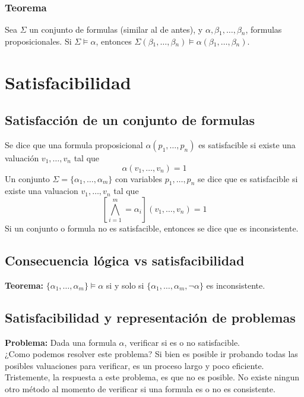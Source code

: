 \documentclass{article}
\begin{document}
\subsubsection{Teorema}
Sea $\Sigma$ un conjunto de formulas (similar al de antes), y $\alpha{}, \beta{}_{1}, \ldots{}, \beta{}_{n}$, formulas proposicionales. Si $\Sigma{} \models{} \alpha{}$, entonces $\Sigma{}(\beta{}_{1}, \ldots{}, \beta{}_{n}) \models{} \alpha{}(\beta{}_{1}, \ldots{}, \beta{}_{n})$.

\section{Satisfacibilidad}
\subsection{Satisfacción de un conjunto de formulas}
Se dice que una formula proposicional $\alpha(p_{1}, \ldots{}, p_{n})$ es satisfacible si existe una valuación $v_{1}, \ldots{}, v_{n}$ tal que
$$\alpha{}(v_{1}, \ldots{}, v_{n}) = 1$$
Un conjunto $\Sigma = \{ \alpha{}_{1}, \ldots{}, \alpha{}_{m} \}$ con variables $p_{1}, \ldots{}, p_{n}$ se dice que es satisfacible si existe una valuacion $v_{1}, \ldots{}, v_{n}$ tal que
$$[ \bigwedge_{i = 1}^{m} = \alpha{}_{i} ] (v_{1}, \ldots{}, v_{n}) = 1$$
Si un conjunto o formula no es satisfacible, entonces se dice que es inconsistente.\\

\subsection{Consecuencia lógica vs satisfacibilidad}
\textbf{Teorema:} $\{\alpha{}_{1}, \ldots{}, \alpha{}_{m}\} \models{} \alpha{}$ si y solo si $\{ \alpha{}_{1}, \ldots{}, \alpha{}_{m}, \neg{} \alpha \}$ es inconsistente.

\subsection{Satisfacibilidad y representación de problemas}
\textbf{Problema:} Dada una formula $\alpha$, verificar si es o no satisfacible.\\
¿Como podemos resolver este problema? Si bien es posible ir probando todas las posibles valuaciones para verificar, es un proceso largo y poco eficiente. Tristemente, la respuesta a este problema, es que no es posible. No existe ningun otro método al momento de verificar si una formula es o no es consistente.
\end{document}
